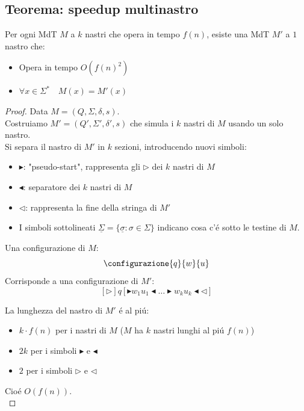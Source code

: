 \subsection{Teorema: speedup multinastro}
\label{teorema:speedup_multinastro}
Per ogni MdT $M$ a $k$ nastri che opera in tempo $f(n)$, esiste una MdT $M'$ a $1$ nastro che: 
\begin{itemize} 
	\item Opera in tempo $O(f(n)^2)$ 
	\item $\forall x \in \Sigma^* \quad M(x) = M'(x)$ 
\end{itemize}
\begin{proof}
Data $M = (Q, \Sigma, \delta, s)$. \\
Costruiamo $M' = (Q', \Sigma', \delta', s)$ che simula i $k$ nastri di $M$ usando un solo nastro. \\
Si separa il nastro di $M'$ in $k$ sezioni, introducendo nuovi simboli: 
\begin{itemize}
	\item $\blacktriangleright$: "pseudo-start", rappresenta gli $\triangleright$ dei $k$ nastri di $M$
	\item $\blacktriangleleft$: separatore dei $k$ nastri di $M$
	\item $\triangleleft$: rappresenta la fine della stringa di $M'$
	\item I simboli sottolineati $\underline{\Sigma} = \{\underline{\sigma} : \sigma \in \Sigma \}$ indicano cosa c'é sotto le testine di $M$.
\end{itemize}
{
Una configurazione di $M$:
\[
	\configurazione{q}{w}{u}
\] 
Corrisponde a una configurazione di $M'$:
\[
	[{\triangleright}] q [\blacktriangleright w_1 u_1 \blacktriangleleft \dots \blacktriangleright w_k u_k \blacktriangleleft \triangleleft ]
\]
}
{
La lunghezza del nastro di $M'$ é al piú:
\begin{itemize}
	\item $k \cdot f(n)$ per i nastri di $M$ 
		\subitem ($M$ ha $k$ nastri lunghi al piú $f(n)$)
	\item $2k$ per i simboli $\blacktriangleright$ e $\blacktriangleleft$
	\item $2$ per i simboli $\triangleright$ e $\triangleleft$
\end{itemize}
Cioé $O(f(n))$. \\
}


\end{proof}
